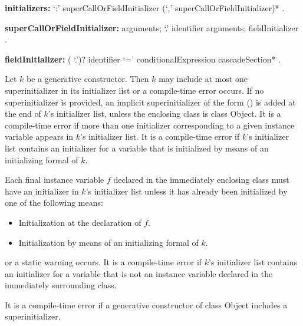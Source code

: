 \documentclass{article}
\newcommand{\code}[1]{{\sf #1}}
\begin{document}
\begin{grammar}
{\bf initializers:}
      `{\escapegrammar :}' superCallOrFieldInitializer (`,' superCallOrFieldInitializer)*
    .


{\bf superCallOrFieldInitializer:}\SUPER{} arguments;
      \SUPER{} `{\escapegrammar .}' identifier arguments;
     fieldInitializer
    .

   {\bf  fieldInitializer:}
      (\THIS{} `{\escapegrammar .}')? identifier `=' conditionalExpression cascadeSection*
    .

\end{grammar}

\LMHash{}
Let $k$ be a generative constructor.  Then $k$ may include at most one  superinitializer in its initializer list or a compile-time error occurs. If no superinitializer is provided, an implicit superinitializer of the form \SUPER{}() is added at the end of $k$'s initializer list, unless the enclosing class is class \code{Object}. It is a compile-time error if more than one initializer corresponding to a given instance variable appears in $k$'s initializer list. It is a compile-time error if $k$'s initializer list contains an initializer for a variable that is initialized by means of an initializing formal of $k$. %

\LMHash{}
Each final instance variable $f$ declared in the immediately enclosing class must have an initializer in $k$'s initializer list unless it has already been initialized by one of the following means:
 \begin{itemize}
 \item Initialization at the declaration of $f$.
 \item Initialization by  means of an initializing formal of $k$.
 \end{itemize}

or a static warning occurs. It is a compile-time error if $k$'s initializer list contains an initializer for a variable that is not an instance variable declared in the immediately surrounding class.



\LMHash{}
 It is a compile-time error if a  generative constructor of class \code{Object} includes a superinitializer.
\end{document}
